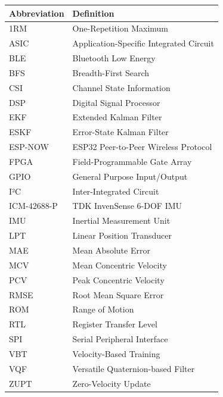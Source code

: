 \documentclass[12pt,a4paper,oneside]{book}
\begin{document}
\begin{tabular}{@{}ll@{}}
    \toprule
    \textbf{Abbreviation} & \textbf{Definition} \\
    \midrule
    1RM & One-Repetition Maximum \\
    ASIC & Application-Specific Integrated Circuit \\
    BLE & Bluetooth Low Energy \\
    BFS & Breadth-First Search \\
    CSI & Channel State Information \\
    DSP & Digital Signal Processor \\
    EKF & Extended Kalman Filter \\
    ESKF & Error-State Kalman Filter \\
    ESP-NOW & ESP32 Peer-to-Peer Wireless Protocol \\
    FPGA & Field-Programmable Gate Array \\
    GPIO & General Purpose Input/Output \\
    I²C & Inter-Integrated Circuit \\
    ICM-42688-P & TDK InvenSense 6-DOF IMU \\
    IMU & Inertial Measurement Unit \\
    LPT & Linear Position Transducer \\
    MAE & Mean Absolute Error \\
    MCV & Mean Concentric Velocity \\
    PCV & Peak Concentric Velocity \\
    RMSE & Root Mean Square Error \\
    ROM & Range of Motion \\
    RTL & Register Transfer Level \\
    SPI & Serial Peripheral Interface \\
    VBT & Velocity-Based Training \\
    VQF & Versatile Quaternion-based Filter \\
    ZUPT & Zero-Velocity Update \\
    \bottomrule
\end{tabular}

\newpage
\end{document}
